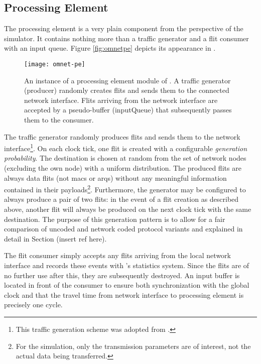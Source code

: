 \subsection{Processing Element}
The processing element is a very plain component from the perspective of the simulator. It contains nothing more than a traffic generator and a flit
consumer with an input queue. Figure \vref{fig:omnetpe} depicts its appearance in \omnet{}.

\begin{figure}
    \centering
    \texttt{[image: omnet-pe]}
    \caption[Simulator view of the processing element]{An instance of a processing element module of \omnet{}. A traffic generator (producer) randomly
    creates flits and sends them to the connected network interface. Flits arriving from the network interface are accepted by a pseudo-buffer
    (inputQueue) that subsequently passes them to the consumer.}
    \label{fig:omnetpe}
\end{figure}

The traffic generator randomly produces flits and sends them to the network interface\footnote{This traffic generation scheme was adopted from
\citeauthor{moriam18activeattackers} \cite{moriam18activeattackers}.}. On each clock tick, one flit is created with a configurable
\textit{generation probability}. The destination is chosen at random from the set of network nodes (excluding the own node) with a uniform
distribution. The produced flits are always data flits (not \glspl{mac} or \glspl{arq}) without any meaningful information contained in their
payloads\footnote{For the simulation, only the transmission parameters are of interest, not the actual data being transferred.}. Furthermore, the
generator may be configured to always produce a pair of two flits: in the event of a flit creation as described above, another flit will always be
produced on the next clock tick with the same destination. The purpose of this generation pattern is to allow for a fair comparison of uncoded and
network coded protocol variants and explained in detail in Section (insert ref here).

The flit consumer simply accepts any flits arriving from the local network interface and records these events with \omnet{}'s statistics system. Since
the flits are of no further use after this, they are subsequently destroyed. An input buffer is located in front of the consumer to ensure both
synchronization with the global clock and that the travel time from network interface to processing element is precisely one cycle.

